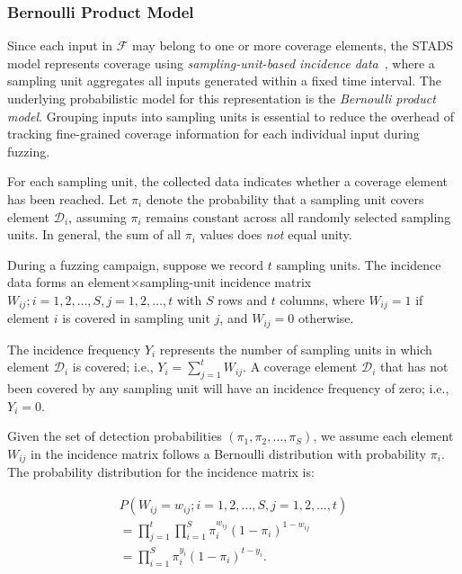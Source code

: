 \documentclass[conference,anonymous,review]{IEEEtran}
\begin{document}
\subsubsection{Bernoulli Product Model}
Since each input in $\mathcal{F}$ may belong to one or more coverage elements, the STADS model represents coverage using \emph{sampling-unit-based incidence data}~\cite{colwell2012models,chao2017thirty}, where a sampling unit aggregates all inputs generated within a fixed time interval. The underlying probabilistic model for this representation is the \emph{Bernoulli product model}. Grouping inputs into sampling units is essential to reduce the overhead of tracking fine-grained coverage information for each individual input during fuzzing.

For each sampling unit, the collected data indicates whether a coverage element
has been reached. Let $\pi_i$ denote the probability that a sampling unit covers
element $\mathcal{D}_i$, assuming $\pi_i$ remains constant across all randomly
selected sampling units.
In general, the sum of all $\pi_i$ values does \emph{not} equal unity.

During a fuzzing campaign, suppose we record $t$ sampling units. The incidence data forms an element$\times$sampling-unit incidence matrix ${W_{ij};i=1,2,\dots,S,j=1,2,\dots,t}$ with $S$ rows and $t$ columns, where $W_{ij} = 1$ if element $i$ is covered in sampling unit $j$, and $W_{ij} = 0$ otherwise.

The incidence frequency $Y_i$ represents the number of sampling units in which element $\mathcal{D}_i$ is covered; i.e., $Y_i=\sum_{j=1}^{t}W_{ij}$. A coverage element $\mathcal{D}_i$ that has not been covered by any sampling unit will have an incidence frequency of zero; i.e., $Y_i=0$.

Given the set of detection probabilities $(\pi_1,\pi_2,\dots,\pi_S)$, we assume each element $W_{ij}$ in the incidence matrix follows a Bernoulli distribution with probability $\pi_i$. The probability distribution for the incidence matrix is:

\begin{equation}
    \begin{split}
        P(W_{ij}=w_{ij};i=1,2,\dots,S,j=1,2,\dots,t) \\
        = \prod_{j=1}^{t}\prod_{i=1}^{S}\pi_i^{w_{ij}}(1-\pi_i)^{1-w_{ij}} \\
        = \prod_{i=1}^{S}\pi_i^{y_i}(1-\pi_i)^{t-y_i}.
    \end{split}
\end{equation}
\end{document}
